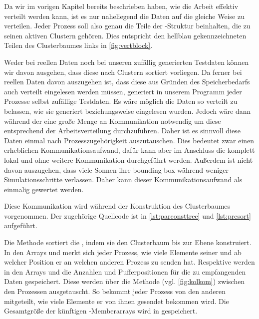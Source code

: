     Da wir im vorigen Kapitel bereits beschrieben haben, wie die Arbeit effektiv verteilt werden kann, ist es nur naheliegend die Daten auf die gleiche Weise zu verteilen. Jeder Prozess soll also 
    genau die Teile der -Struktur beinhalten, die zu seinen aktiven Clustern gehören. Dies entspricht den hellblau gekennzeichneten Teilen des Clusterbaumes links in \autoref{fig:vertblock}.
    
    Weder bei reellen Daten noch bei unseren zufällig generierten Testdaten können wir davon ausgehen, dass diese nach Clustern sortiert vorliegen. Da ferner bei reellen Daten davon auszugehen
    ist, dass diese aus Gründen des Speicherbedarfs auch verteilt eingelesen werden müssen, generiert in unserem Programm jeder Prozesse selbst zufällige Testdaten. Es wäre möglich die Daten 
    so verteilt zu belassen, wie sie generiert beziehungsweise eingelesen wurden. Jedoch wäre dann während der \vorruck eine große Menge an Kommunikation notwendig um diese entsprechend der 
    Arbeitsverteilung durchzuführen. Daher ist es sinnvoll diese Daten einmal nach Prozesszugehörigkeit auszutauschen. Dies bedeutet zwar einen erheblichen Kommunikationsaufwand, dafür kann aber im
    Anschluss die \vorruck komplett lokal und ohne weitere Kommunikation durchgeführt werden. Außerdem ist nicht davon auszugehen, dass viele Sonnen ihre bounding box während weniger Simulationsschritte
    verlassen. Daher kann dieser Kommunikationsaufwand als einmalig gewertet werden.
    
    Diese Kommunikation wird während der Konstruktion des Clusterbaumes vorgenommen. Der zugehörige Quellcode ist in \autoref{lst:parconsttree} und \autoref{lst:presort} aufgeführt.
    
    Die Methode  sortiert die , indem sie den Clusterbaum bis zur Ebene  konstruiert. In den Arrays  und 
    merkt sich jeder Prozess, wie viele Elemente seiner  und ab welcher Position er an welchen anderen Prozess zu senden hat. Respektive werden in den Arrays  
    und  die Anzahlen und Pufferpositionen für die zu empfangenden Daten gespeichert. Diese werden über die Methode  (vgl. \autoref{fig:kolkom}) zwischen 
    den Prozessen ausgetauscht. So bekommt jeder Prozess von den anderen mitgeteilt, wie viele Elemente er von ihnen gesendet bekommen wird. Die Gesamtgröße der künftigen -Memberarrays
    wird in  gespeichert.
    
